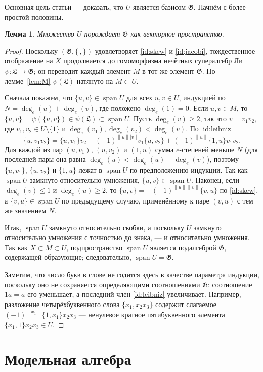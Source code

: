 \documentclass[11pt,reqno]{amsart}
\newcommand{\G}{\mathfrak G}
\newcommand{\LL}{\mathfrak L}
\newcommand{\rp}[1]{\|#1\|}
\DeclareMathOperator{\spn}{span}
\theoremstyle{plain}
\newtheorem{lemma}[theorem]{Лемма}
\theoremstyle{definition}
\theoremstyle{remark}
\begin{document}
Основная цель статьи --- доказать, что $U$ является базисом $\G$.
Начнём с более простой половины.

\begin{lemma}\label{vsp}
Множество $U$ порождает $\G$ как векторное пространство.
\end{lemma}

\begin{proof}
Поскольку $(\G,\{\,,\})$ удовлетворяет \eqref{id:skew} и \eqref{id:jacobi}, тождественное отображение на $X$ продолжается до гомоморфизма нечётных супералгебр Ли $\psi\colon\LL\to\G$; он переводит каждый элемент $M$ в тот же элемент $\G$.
По лемме~\ref{lem:M} $\psi(\LL)$ натянуто на $M\subset U$.

Сначала покажем, что $\{u,v\}\in\spn U$ для всех $u,v\in U$, индукцией по $N=\deg_e(u)+\deg_e(v)$, где положено $\deg_e(1)=0$.
Если $u,v\in M$, то $\{u,v\}=\psi(\{u,v\})\in\psi(\LL)\subset\spn U$.
Пусть $\deg_e(v)\ge2$, так что $v=v_1v_2$, где $v_1,v_2\in U\setminus\{1\}$ и $\deg_e(v_1),\deg_e(v_2)<\deg_e(v)$.
По \eqref{id:leibniz}
$$
\{u,v_1v_2\}=\{u,v_1\}v_2+(-1)^{\rp u|v_1|}v_1\{u,v_2\}+(-1)^{\rp u}\{1,u\}v_1v_2 .
$$
Для каждой из пар $(u,v_1)$, $(u,v_2)$ и $(1,u)$ сумма $e$-степеней меньше $N$ (для последней пары она равна $\deg_e(u)<\deg_e(u)+\deg_e(v)$), поэтому $\{u,v_1\}$, $\{u,v_2\}$ и $\{1,u\}$ лежат в $\spn U$ по предположению индукции.
Так как $\spn U$ замкнуто относительно умножения, $\{u,v\}\in\spn U$.
Наконец, если $\deg_e(v)\le1$ и $\deg_e(u)\ge2$, то $\{u,v\}=-(-1)^{\rp u\rp v}\{v,u\}$ по \eqref{id:skew}, а $\{v,u\}\in\spn U$ по предыдущему случаю, применённому к паре $(v,u)$ с тем же значением $N$.

Итак, $\spn U$ замкнуто относительно скобки, а поскольку $U$ замкнуто относительно умножения с точностью до знака, --- и относительно умножения.
Так как $X\subset M\subset U$, подпространство $\spn U$ является подалгеброй $\G$, содержащей образующие; следовательно, $\spn U=\G$.

Заметим, что число букв в слове не годится здесь в качестве параметра индукции, поскольку оно не сохраняется определяющими соотношениями $\G$: соотношение $1a=a$ его уменьшает, а последний член \eqref{id:leibniz} увеличивает.
Например, разложение четырёхбуквенного слова $\{x_1,x_2x_3\}$ содержит слагаемое $(-1)^{\rp{x_1}}\{1,x_1\}x_2x_3$ --- ненулевое кратное пятибуквенного элемента $\{x_1,1\}x_2x_3\in U$.
\end{proof}

\section{Модельная алгебра}\label{sec:model}
\end{document}
